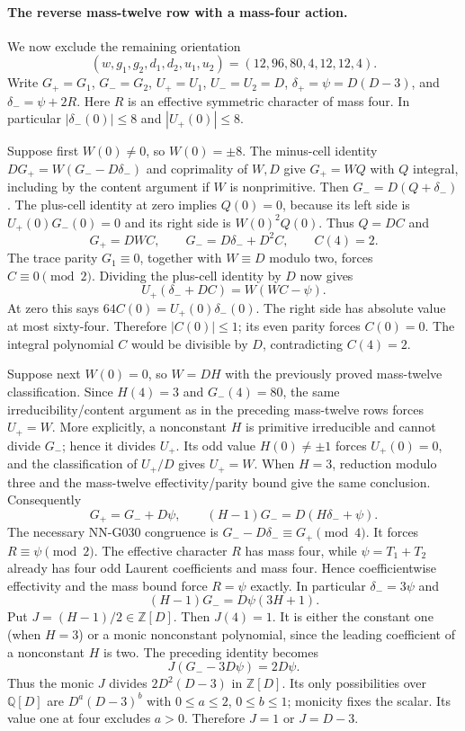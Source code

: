 \paragraph{The reverse mass-twelve row with a mass-four action.}
We now exclude the remaining orientation
\[
 (w,g_1,g_2,d_1,d_2,u_1,u_2)
                  =(12,96,80,4,12,12,4).
\]
Write $G_+=G_1$, $G_-=G_2$, $U_+=U_1$, $U_-=U_2=D$,
$\delta_+=\psi=D(D-3)$, and $\delta_-=\psi+2R$.
Here $R$ is an effective symmetric character of mass four.
In particular $|\delta_-(0)|\le8$ and $|U_+(0)|\le8$.

Suppose first $W(0)\ne0$, so $W(0)=\pm8$.
The minus-cell identity
$DG_+=W(G_--D\delta_-)$ and coprimality of $W,D$
give $G_+=WQ$ with $Q$ integral, including by the content
argument if $W$ is nonprimitive.
Then $G_-=D(Q+\delta_-)$.
The plus-cell identity at zero implies $Q(0)=0$, because
its left side is $U_+(0)G_-(0)=0$ and its right side is
$W(0)^2Q(0)$.
Thus $Q=DC$ and
\[
 G_+=DWC,\qquad G_-=D\delta_-+D^2C,\qquad C(4)=2.
\]
The trace parity $G_1\equiv0$, together with $W\equiv D$
modulo two, forces $C\equiv0\pmod2$.
Dividing the plus-cell identity by $D$ now gives
\[
 U_+(\delta_-+DC)=W(WC-\psi).
\]
At zero this says
$64C(0)=U_+(0)\delta_-(0)$.
The right side has absolute value at most sixty-four.
Therefore $|C(0)|\le1$; its even parity forces $C(0)=0$.
The integral polynomial $C$ would be divisible by $D$,
contradicting $C(4)=2$.

Suppose next $W(0)=0$, so $W=DH$ with the previously
proved mass-twelve classification. Since $H(4)=3$ and
$G_-(4)=80$, the same irreducibility/content argument
as in the preceding mass-twelve rows forces $U_+=W$.
More explicitly, a nonconstant $H$ is primitive irreducible
and cannot divide $G_-$; hence it divides $U_+$.
Its odd value $H(0)\ne\pm1$ forces $U_+(0)=0$,
and the classification of $U_+/D$ gives $U_+=W$.
When $H=3$, reduction modulo three and the mass-twelve
effectivity/parity bound give the same conclusion.
Consequently
\[
 G_+=G_-+D\psi,\qquad
                  (H-1)G_-=D(H\delta_-+\psi).
\]
The necessary NN-G030 congruence is
$G_--D\delta_-\equiv G_+\pmod4$.
It forces $R\equiv\psi\pmod2$.
The effective character $R$ has mass four, while
$\psi=T_1+T_2$ already has four odd Laurent coefficients
and mass four. Hence coefficientwise effectivity and
the mass bound force $R=\psi$ exactly. In particular
$\delta_-=3\psi$ and
\[
                    (H-1)G_-=D\psi(3H+1).
\]
Put $J=(H-1)/2\in\mathbb Z[D]$.
Then $J(4)=1$. It is either the constant one (when $H=3$)
or a monic nonconstant polynomial, since the leading
coefficient of a nonconstant $H$ is two.
The preceding identity becomes
\[
                    J(G_--3D\psi)=2D\psi.
\]
Thus the monic $J$ divides $2D^2(D-3)$ in $\mathbb Z[D]$.
Its only possibilities over $\mathbb Q[D]$ are
$D^a(D-3)^b$ with $0\le a\le2$, $0\le b\le1$;
monicity fixes the scalar. Its value one at four
excludes $a>0$. Therefore $J=1$ or $J=D-3$.

